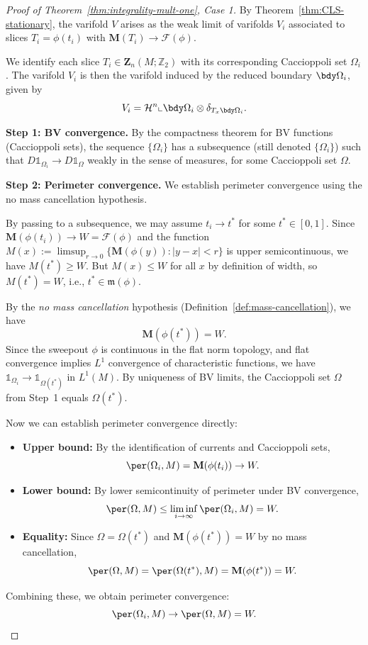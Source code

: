 \begin{proof}[Proof of Theorem~\ref{thm:integrality-mult-one}, Case 1]
By Theorem~\ref{thm:CLS-stationary}, the varifold $V$ arises as the weak limit of varifolds $V_i$
associated to slices $T_i = \phi(t_i)$ with $\mathbf{M}(T_i) \to \mathcal{F}(\phi)$.

We identify each slice $T_i \in \mathbf{Z}_n(M;\mathbb{Z}_2)$ with its corresponding Caccioppoli set
$\Omega_i$. The
varifold $V_i$ is then the varifold induced by the reduced boundary $\bdy\Omega_i$, given by
\[
    V_i = \mathcal{H}^n \llcorner \bdy\Omega_i \otimes \delta_{T_x\bdy\Omega_i}.
\]

\textbf{Step 1: BV convergence.} By the compactness theorem for BV functions (Caccioppoli sets), the
sequence $\{\Omega_i\}$ has a subsequence (still denoted $\{\Omega_i\}$) such that
$D\mathbb{1}_{\Omega_i} \to D\mathbb{1}_\Omega$ weakly in the sense of measures, for some
Caccioppoli set $\Omega$.

\textbf{Step 2: Perimeter convergence.} We establish perimeter convergence using the no mass cancellation hypothesis.

By passing to a subsequence, we may assume $t_i \to t^*$ for some $t^* \in [0,1]$. Since $\mathbf{M}(\phi(t_i)) \to W = \mathcal{F}(\phi)$ and the function $M(x) := \limsup_{r \to 0} \{\mathbf{M}(\phi(y)) : |y - x| < r\}$ is upper semicontinuous, we have $M(t^*) \geq W$. But $M(x) \leq W$ for all $x$ by definition of width, so $M(t^*) = W$, i.e., $t^* \in \mathfrak{m}(\phi)$.

By the \emph{no mass cancellation} hypothesis (Definition~\ref{def:mass-cancellation}), we have
\[
    \mathbf{M}(\phi(t^*)) = W.
\]
Since the sweepout $\phi$ is continuous in the flat norm topology, and flat convergence implies $L^1$ convergence of characteristic functions, we have $\mathbb{1}_{\Omega_i} \to \mathbb{1}_{\Omega(t^*)}$ in $L^1(M)$. By uniqueness of BV limits, the Caccioppoli set $\Omega$ from Step~1 equals $\Omega(t^*)$.

Now we can establish perimeter convergence directly:
\begin{itemize}
    \item \textbf{Upper bound:} By the identification of currents and Caccioppoli sets,
    \[
        \per(\Omega_i, M) = \mathbf{M}(\phi(t_i)) \to W.
    \]
    \item \textbf{Lower bound:} By lower semicontinuity of perimeter under BV convergence,
    \[
        \per(\Omega, M) \leq \liminf_{i \to \infty} \per(\Omega_i, M) = W.
    \]
    \item \textbf{Equality:} Since $\Omega = \Omega(t^*)$ and $\mathbf{M}(\phi(t^*)) = W$ by no mass cancellation,
    \[
        \per(\Omega, M) = \per(\Omega(t^*), M) = \mathbf{M}(\phi(t^*)) = W.
    \]
\end{itemize}
Combining these, we obtain perimeter convergence:
\[
    \per(\Omega_i, M) \to \per(\Omega, M) = W.
\]


\end{proof}
